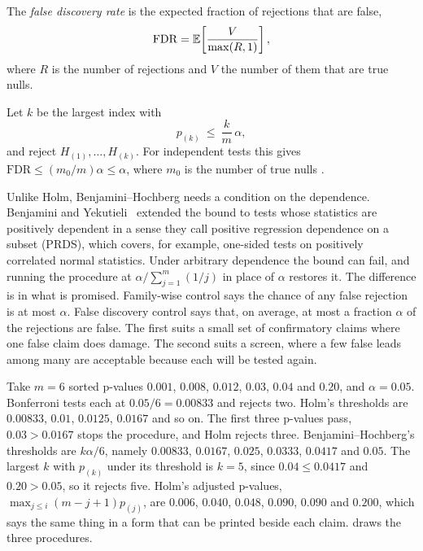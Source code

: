 The \emph{false discovery rate} is the expected fraction of rejections that are false,
\begin{equation}
\mathrm{FDR}=\mathbb{E}\!\left[\frac{V}{\max(R,1)}\right],
\label{eq:ch09:fdr}
\end{equation}
where $R$ is the number of rejections and $V$ the number of them that are true nulls.
\begin{definition}\label{def:ch09:bh}
Let $k$ be the largest index with
\begin{equation}
p_{(k)}\ \le\ \frac{k}{m}\,\alpha,
\label{eq:ch09:bh}
\end{equation}
and reject $H_{(1)},\dots,H_{(k)}$. For independent tests this gives $\mathrm{FDR}\le (m_0/m)\alpha\le\alpha$, where $m_0$ is the number of true nulls \citep{benjaminihochberg1995}.
\end{definition}
Unlike Holm, Benjamini--Hochberg needs a condition on the dependence. Benjamini and Yekutieli~\citep{benjaminiyekutieli2001} extended the bound to tests whose statistics are positively dependent in a sense they call positive regression dependence on a subset (PRDS), which covers, for example, one-sided tests on positively correlated normal statistics. Under arbitrary dependence the bound can fail, and running the procedure at $\alpha/\sum_{j=1}^m(1/j)$ in place of $\alpha$ restores it.
The difference is in what is promised. Family-wise control says the chance of any false rejection is at most $\alpha$. False discovery control says that, on average, at most a fraction $\alpha$ of the rejections are false. The first suits a small set of confirmatory claims where one false claim does damage. The second suits a screen, where a few false leads among many are acceptable because each will be tested again.

\begin{example}\label{ex:ch09:mc}
Take $m=6$ sorted p-values $0.001$, $0.008$, $0.012$, $0.03$, $0.04$ and $0.20$, and $\alpha=0.05$. Bonferroni tests each at $0.05/6=0.00833$ and rejects two. Holm's thresholds are $0.00833$, $0.01$, $0.0125$, $0.0167$ and so on. The first three p-values pass, $0.03>0.0167$ stops the procedure, and Holm rejects three. Benjamini--Hochberg's thresholds are $k\alpha/6$, namely $0.00833$, $0.0167$, $0.025$, $0.0333$, $0.0417$ and $0.05$. The largest $k$ with $p_{(k)}$ under its threshold is $k=5$, since $0.04\le0.0417$ and $0.20>0.05$, so it rejects five. Holm's adjusted p-values, $\max_{j\le i}(m-j+1)p_{(j)}$, are $0.006$, $0.040$, $0.048$, $0.090$, $0.090$ and $0.200$, which says the same thing in a form that can be printed beside each claim.  draws the three procedures.
\end{example}

